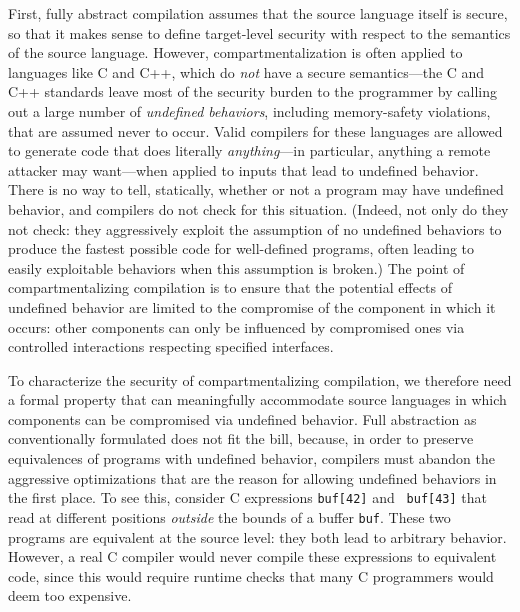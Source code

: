 \documentclass[10pt, conference, compsocconf, letterpaper, times]{IEEEtran}
\begin{document}
First, fully abstract compilation assumes that the source language itself is
secure,
so that it makes sense to define target-level security with respect to the
semantics of the source language.
However, compartmentalization is often applied to languages like C and C++,
which do {\em not} have a secure semantics---the C and C++ standards leave
most of the security burden to the programmer by calling out a large number
of {\em undefined behaviors}, including memory-safety violations, that are
assumed never to occur.
Valid compilers for these languages are allowed to generate code that does
literally {\em anything}---in particular, anything a remote
attacker may want---when applied to inputs that lead to undefined behavior.
There is no way to tell, statically, whether or not a program may have
undefined behavior, and compilers do not check for this situation.  (Indeed,
not only do they not check: they aggressively exploit the assumption of no
undefined behaviors to produce the fastest possible code for well-defined
programs, often leading to easily exploitable behaviors when this assumption
is broken.)
The point of compartmentalizing compilation
is to ensure that the potential effects of undefined
behavior are limited to the compromise of the component in which it occurs:
other components can only be influenced by compromised
ones via controlled interactions respecting specified interfaces.

To characterize the security of compartmentalizing
compilation, we therefore need a formal property that can meaningfully
accommodate source languages in which components can be compromised
via undefined behavior.
Full abstraction as conventionally formulated does not fit the bill,
because, in order to preserve equivalences of programs with undefined
behavior, compilers must abandon the aggressive optimizations that are
the reason for allowing undefined behaviors in the first place.
To see this, consider C expressions {\tt buf[42]} and {\tt
  buf[43]} that read at different positions {\em outside} the bounds of a
buffer {\tt buf}.
These two programs are equivalent at the source level: they both
lead to arbitrary behavior.
However, a real C compiler would never compile these expressions to
equivalent code, since this would require runtime checks that many C
programmers would deem too expensive.
\end{document}
